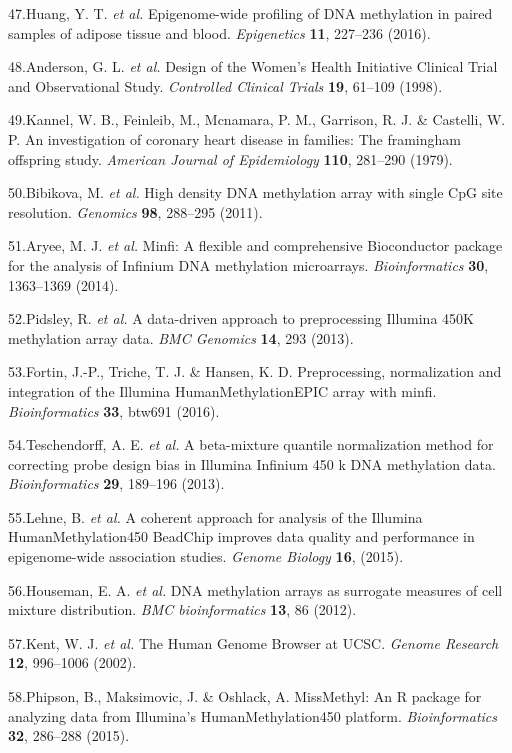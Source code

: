 \documentclass[]{article}
\theoremstyle{definition}
\theoremstyle{definition}
\theoremstyle{definition}
\theoremstyle{remark}
\begin{document}
47.Huang, Y. T. \emph{et al.} Epigenome-wide profiling of DNA
methylation in paired samples of adipose tissue and blood.
\emph{Epigenetics} \textbf{11}, 227--236 (2016).

48.Anderson, G. L. \emph{et al.} Design of the Women's Health Initiative
Clinical Trial and Observational Study. \emph{Controlled Clinical
Trials} \textbf{19}, 61--109 (1998).

49.Kannel, W. B., Feinleib, M., Mcnamara, P. M., Garrison, R. J. \&
Castelli, W. P. An investigation of coronary heart disease in families:
The framingham offspring study. \emph{American Journal of Epidemiology}
\textbf{110}, 281--290 (1979).

50.Bibikova, M. \emph{et al.} High density DNA methylation array with
single CpG site resolution. \emph{Genomics} \textbf{98}, 288--295
(2011).

51.Aryee, M. J. \emph{et al.} Minfi: A flexible and comprehensive
Bioconductor package for the analysis of Infinium DNA methylation
microarrays. \emph{Bioinformatics} \textbf{30}, 1363--1369 (2014).

52.Pidsley, R. \emph{et al.} A data-driven approach to preprocessing
Illumina 450K methylation array data. \emph{BMC Genomics} \textbf{14},
293 (2013).

53.Fortin, J.-P., Triche, T. J. \& Hansen, K. D. Preprocessing,
normalization and integration of the Illumina HumanMethylationEPIC array
with minfi. \emph{Bioinformatics} \textbf{33}, btw691 (2016).

54.Teschendorff, A. E. \emph{et al.} A beta-mixture quantile
normalization method for correcting probe design bias in Illumina
Infinium 450 k DNA methylation data. \emph{Bioinformatics} \textbf{29},
189--196 (2013).

55.Lehne, B. \emph{et al.} A coherent approach for analysis of the
Illumina HumanMethylation450 BeadChip improves data quality and
performance in epigenome-wide association studies. \emph{Genome Biology}
\textbf{16}, (2015).

56.Houseman, E. A. \emph{et al.} DNA methylation arrays as surrogate
measures of cell mixture distribution. \emph{BMC bioinformatics}
\textbf{13}, 86 (2012).

57.Kent, W. J. \emph{et al.} The Human Genome Browser at UCSC.
\emph{Genome Research} \textbf{12}, 996--1006 (2002).

58.Phipson, B., Maksimovic, J. \& Oshlack, A. MissMethyl: An R package
for analyzing data from Illumina's HumanMethylation450 platform.
\emph{Bioinformatics} \textbf{32}, 286--288 (2015).
\end{document}
